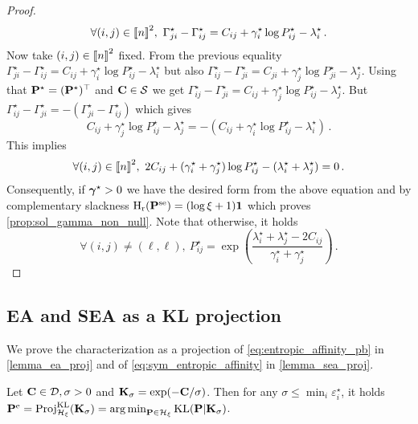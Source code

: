 \begin{proof}
\begin{equation}
\forall (i,j) \in {[\![n]\!]}^2, \ \Gamma^\star_{ji}-\Gamma^\star_{ij} =  C_{ij}+\gamma^\star_i \log P^\star_{ij}-\lambda^\star_i\,.
\end{equation}
Now take $(i,j) \in {[\![n]\!]}^2$ fixed. From the previous equality 
$\Gamma^\star_{ji}-\Gamma^\star_{ij} =  C_{ij}+\gamma^\star_i \log P^\star_{ij}-\lambda^\star_i$ but also $\Gamma^\star_{ij}-\Gamma^\star_{ji} =  C_{ji}+\gamma^\star_j \log P^\star_{ji}-\lambda^\star_j$. Using that ${\mathbf{P}}^\star=({\mathbf{P}}^{\star})^{\top}$ and $\mathbf{C} \in \mathcal{S}$ we get $\Gamma^\star_{ij}-\Gamma^\star_{ji} =  C_{ij}+\gamma^\star_j \log P^\star_{ij}-\lambda^\star_j$. But $\Gamma^\star_{ij}-\Gamma^\star_{ji} = -(\Gamma^\star_{ji}-\Gamma^\star_{ij})$ which gives
\begin{equation}
C_{ij}+\gamma^\star_j \log P^\star_{ij}-\lambda^\star_j =  -(C_{ij}+\gamma^\star_i \log P^\star_{ij}-\lambda^\star_i)\,.
\end{equation}
This implies
\begin{equation}
\forall (i,j) \in {[\![n]\!]}^2, \ 2C_{ij}+(\gamma^\star_i+\gamma^\star_j) \log P^\star_{ij}-(\lambda^\star_i+ \lambda^\star_j) =  0\,.
\end{equation}
Consequently, if $\boldsymbol{\gamma}^\star > 0$ we have the desired form from the above equation and by complementary slackness $\operatorname{H}_{\mathrm{r}}({\mathbf{P}}^{\mathrm{se}}) = (\log \xi + 1)\bm{1}$ which proves \cref{prop:sol_gamma_non_null}. Note that otherwise, it holds
\begin{equation}
\forall (i,j) \neq (\ell, \ell), \ P_{ij}^\star = \exp \left(\frac{\lambda^\star_i+ \lambda^\star_j-2C_{ij}}{\gamma^\star_i+\gamma^\star_j}\right)\,.
\end{equation}
\end{proof}


\subsection{EA and SEA as a KL projection \label{sec:proj_KL}}

We prove the characterization as a projection of \eqref{eq:entropic_affinity_pb}  in \cref{lemma_ea_proj} and of \eqref{eq:sym_entropic_affinity} in \cref{lemma_sea_proj}.

\begin{lemma}\label{lemma_ea_proj}
    Let $\mathbf{C} \in \mathcal{D}, \sigma >0$ and $\mathbf{K}_\sigma = \exp(-\mathbf{C}/\sigma)$. Then for any $\sigma \leq \min_i \varepsilon^\star_i$, it holds ${\mathbf{P}}^{\mathrm{e}} = \operatorname{Proj}^{\operatorname{\operatorname{KL}}}_{\mathcal{H}_{\xi}}(\mathbf{K}_{\sigma}) =  \operatorname*{arg\,min}_{{\mathbf{P}} \in \mathcal{H}_{\xi} } \operatorname{KL}({\mathbf{P}} | \mathbf{K}_\sigma)$.
\end{lemma}

